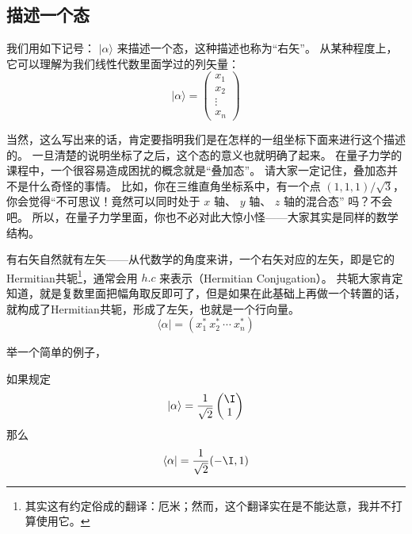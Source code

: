 
\subsection{描述一个态}

我们用如下记号： $|\alpha\rangle$ 来描述一个态，这种描述也称为“右矢”。 从某种程度上，它可以理解为我们线性代数里面学过的列矢量：
\begin{equation}
|\alpha\rangle = \left(\begin{matrix}x_1\\x_2\\ \vdots\\ x_n\end{matrix}\right)
\end{equation}

当然，这么写出来的话，肯定要指明我们是在怎样的一组坐标下面来进行这个描述的。 一旦清楚的说明坐标了之后，这个态的意义也就明确了起来。 在量子力学的课程中，一个很容易造成困扰的概念就是“叠加态”。 请大家一定记住，叠加态并不是什么奇怪的事情。 比如，你在三维直角坐标系中，有一个点 $(1, 1, 1)/\sqrt3$，你会觉得“不可思议！竟然可以同时处于 $x$ 轴、 $y$ 轴、 $z$ 轴的混合态” 吗？不会吧。 所以，在量子力学里面，你也不必对此大惊小怪——大家其实是同样的数学结构。

有右矢自然就有左矢——从代数学的角度来讲，一个右矢对应的左矢，即是它的Hermitian共轭\footnote{其实这有约定俗成的翻译：厄米；然而，这个翻译实在是不能达意，我并不打算使用它。}，通常会用 $h. c$ 来表示（Hermitian Conjugation）。 共轭大家肯定知道，就是复数里面把幅角取反即可了，但是如果在此基础上再做一个转置的话，就构成了Hermitian共轭，形成了左矢，也就是一个行向量。
\begin{equation}
\langle\alpha| = (x_1^*\ x_2^*\ \cdots\ x_n^*)
\end{equation}

举一个简单的例子，

\begin{example}{}
如果规定
\begin{equation}
|\alpha\rangle = \frac{1}{\sqrt{2}}\left(\begin{matrix}\I \\1\end{matrix}\right) 
\end{equation}
那么
\begin{equation}
\langle\alpha| = \frac{1}{\sqrt{2}}(-\I, 1)
\end{equation}
\end{example}

